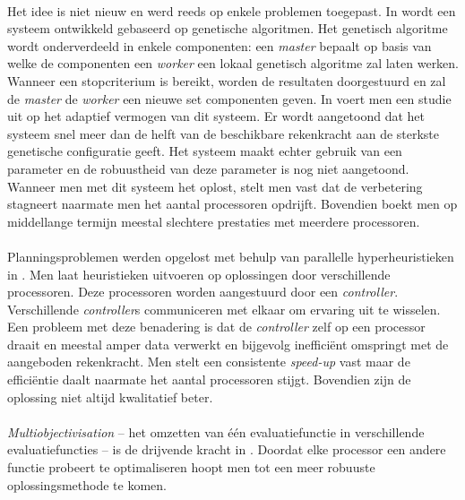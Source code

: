 \paragraph{}
Het idee is niet nieuw en werd reeds op enkele problemen toegepast. In \cite{conf/gecco/LeonMS08,conf/pdp/SeguraSL12} wordt een systeem ontwikkeld gebaseerd op genetische algoritmen. Het genetisch algoritme wordt onderverdeeld in enkele componenten: een \emph{master} bepaalt op basis van welke de componenten een \emph{worker} een lokaal genetisch algoritme zal laten werken. Wanneer een stopcriterium is bereikt, worden de resultaten doorgestuurd en zal de \emph{master} de \emph{worker} een nieuwe set componenten geven. In \cite{conf/pdp/SeguraSL12} voert men een studie uit op het adaptief vermogen van dit systeem. Er wordt aangetoond dat het systeem snel meer dan de helft van de beschikbare rekenkracht aan de sterkste genetische configuratie geeft. Het systeem maakt echter gebruik van een parameter en de robuustheid van deze parameter is nog niet aangetoond. Wanneer men met dit systeem het  oplost, stelt men vast dat de verbetering stagneert naarmate men het aantal processoren opdrijft. Bovendien boekt men op middellange termijn meestal slechtere prestaties met meerdere processoren.

\paragraph{}
Planningsproblemen werden opgelost met behulp van parallelle hyperheuristieken in \cite{Rattadilok04adistributed}. Men laat heuristieken uitvoeren op oplossingen door verschillende processoren. Deze processoren worden aangestuurd door een \emph{controller}. Verschillende \emph{controller}s communiceren met elkaar om ervaring uit te wisselen. Een probleem met deze benadering is dat de \emph{controller} zelf op een processor draait en meestal amper data verwerkt en bijgevolg ineffici\"ent omspringt met de aangeboden rekenkracht. Men stelt een consistente \emph{speed-up} vast maar de effici\"entie daalt naarmate het aantal processoren stijgt. Bovendien zijn de oplossing niet altijd kwalitatief beter.

\paragraph{}
\emph{Multiobjectivisation} -- het omzetten van \'e\'en evaluatiefunctie in verschillende evaluatiefuncties -- is de drijvende kracht in \cite{Luna08usinga}. Doordat elke processor een andere functie probeert te optimaliseren hoopt men tot een meer robuuste oplossingsmethode te komen.
